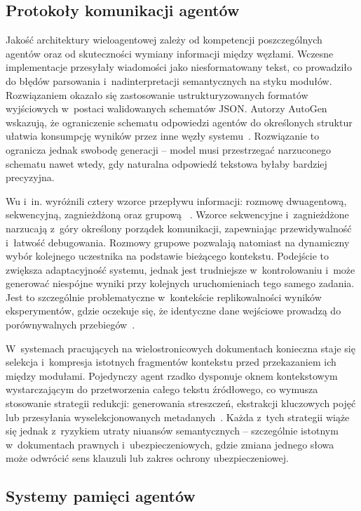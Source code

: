 \subsection{Protokoły komunikacji agentów}\label{subsec:protokoly}

Jakość architektury wieloagentowej zależy od kompetencji poszczególnych agentów
oraz od skuteczności wymiany informacji między węzłami. Wczesne implementacje
przesyłały wiadomości jako niesformatowany tekst, co prowadziło do błędów
parsowania i~nadinterpretacji semantycznych na styku modułów. Rozwiązaniem
okazało się zastosowanie ustrukturyzowanych formatów wyjściowych w~postaci
walidowanych schematów JSON. Autorzy AutoGen wskazują, że ograniczenie schematu
odpowiedzi agentów do określonych struktur ułatwia konsumpcję wyników przez
inne węzły systemu~\cite{wu2024autogen}. Rozwiązanie to ogranicza jednak
swobodę generacji -- model musi przestrzegać narzuconego schematu nawet wtedy,
gdy naturalna odpowiedź tekstowa byłaby bardziej precyzyjna.

Wu i~in. wyróżnili cztery wzorce przepływu informacji: rozmowę dwuagentową,
sekwencyjną, zagnieżdżoną oraz grupową ~\cite{wu2024autogen}. Wzorce
sekwencyjne i~zagnieżdżone narzucają z~góry określony porządek komunikacji,
zapewniając przewidywalność i~łatwość debugowania. Rozmowy grupowe pozwalają
natomiast na dynamiczny wybór kolejnego uczestnika na podstawie bieżącego
kontekstu. Podejście to zwiększa adaptacyjność systemu, jednak jest trudniejsze
w~kontrolowaniu i~może generować niespójne wyniki przy kolejnych uruchomieniach
tego samego zadania. Jest to szczególnie problematyczne w~kontekście
replikowalności wyników eksperymentów, gdzie oczekuje się, że identyczne dane
wejściowe prowadzą do porównywalnych przebiegów~\cite{wu2024autogen,
  wang2024survey}.

W~systemach pracujących na wielostronicowych dokumentach konieczna staje się
selekcja i~kompresja istotnych fragmentów kontekstu przed przekazaniem ich
między modułami. Pojedynczy agent rzadko dysponuje oknem kontekstowym
wystarczającym do przetworzenia całego tekstu źródłowego, co wymusza stosowanie
strategii redukcji: generowania streszczeń, ekstrakcji kluczowych pojęć lub
przesyłania wyselekcjonowanych metadanych~\cite{wang2024survey}. Każda z~tych
strategii wiąże się jednak z~ryzykiem utraty niuansów semantycznych --
szczególnie istotnym w~dokumentach prawnych i~ubezpieczeniowych, gdzie zmiana
jednego słowa może odwrócić sens klauzuli lub zakres ochrony ubezpieczeniowej.

\subsection{Systemy pamięci agentów}\label{subsec:pamiec}

